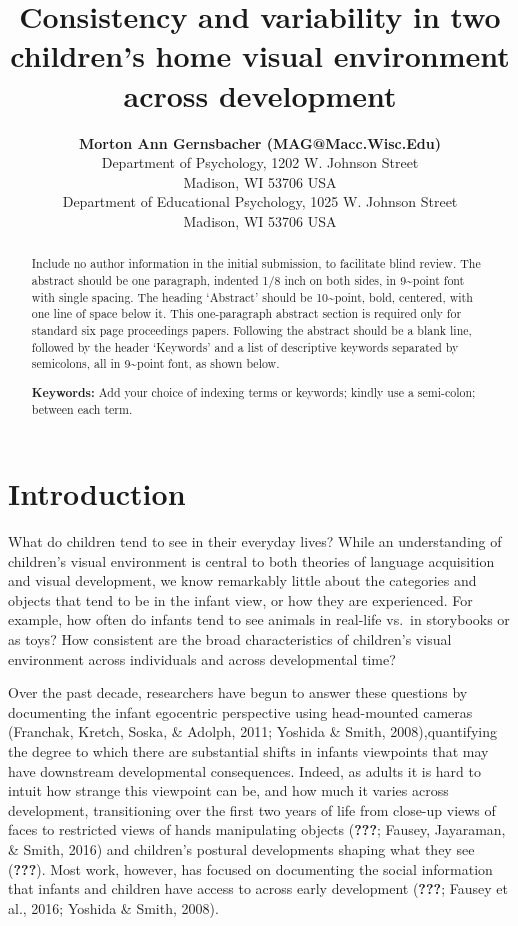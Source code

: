 \documentclass[10pt, letterpaper]{article}
\title{Consistency and variability in two children's home visual environment
across development}
\author{{\large \bf Morton Ann Gernsbacher (MAG@Macc.Wisc.Edu)} \\ Department of Psychology, 1202 W. Johnson Street \\ Madison, WI 53706 USA \AND {\large \bf Sharon J.~Derry (SDJ@Macc.Wisc.Edu)} \\ Department of Educational Psychology, 1025 W. Johnson Street \\ Madison, WI 53706 USA}
\begin{document}
\maketitle

\begin{abstract}
Include no author information in the initial submission, to facilitate
blind review. The abstract should be one paragraph, indented 1/8 inch on
both sides, in 9\textasciitilde point font with single spacing. The
heading `Abstract' should be 10\textasciitilde point, bold, centered,
with one line of space below it. This one-paragraph abstract section is
required only for standard six page proceedings papers. Following the
abstract should be a blank line, followed by the header `Keywords' and a
list of descriptive keywords separated by semicolons, all in
9\textasciitilde point font, as shown below.

\textbf{Keywords:}
Add your choice of indexing terms or keywords; kindly use a semi-colon;
between each term.
\end{abstract}

\hypertarget{introduction}{%
\section{Introduction}\label{introduction}}

What do children tend to see in their everyday lives? While an
understanding of children's visual environment is central to both
theories of language acquisition and visual development, we know
remarkably little about the categories and objects that tend to be in
the infant view, or how they are experienced. For example, how often do
infants tend to see animals in real-life vs.~in storybooks or as toys?
How consistent are the broad characteristics of children's visual
environment across individuals and across developmental time?

Over the past decade, researchers have begun to answer these questions
by documenting the infant egocentric perspective using head-mounted
cameras (Franchak, Kretch, Soska, \& Adolph, 2011; Yoshida \& Smith,
2008),quantifying the degree to which there are substantial shifts in
infants viewpoints that may have downstream developmental consequences.
Indeed, as adults it is hard to intuit how strange this viewpoint can
be, and how much it varies across development, transitioning over the
first two years of life from close-up views of faces to restricted views
of hands manipulating objects ({\textbf{???}}; Fausey, Jayaraman, \&
Smith, 2016) and children's postural developments shaping what they see
({\textbf{???}}). Most work, however, has focused on documenting the
social information that infants and children have access to across early
development ({\textbf{???}}; Fausey et al., 2016; Yoshida \& Smith,
2008).
\end{document}
